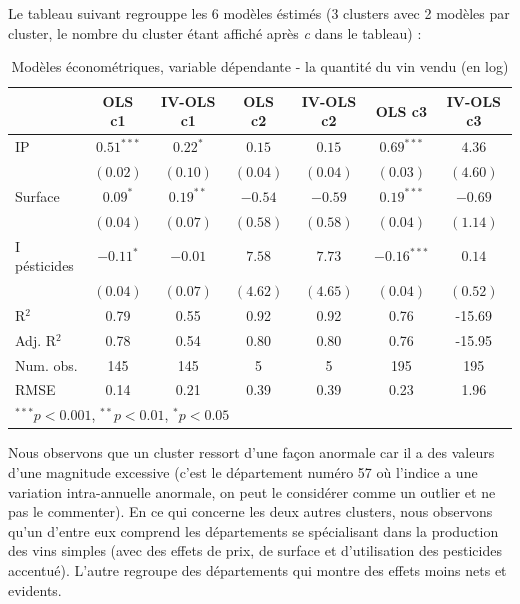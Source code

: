 \documentclass[11pt,]{article}
\begin{document}
Le tableau suivant regrouppe les 6 modèles éstimés (3 clusters avec 2
modèles par cluster, le nombre du cluster étant affiché après \emph{c}
dans le tableau) :

\FloatBarrier

\begin{table}[!htbp]
\begin{center}
\begin{tabular}{l c c c c c c }
\hline
 & OLS c1 & IV-OLS c1 & OLS c2 & IV-OLS c2 & OLS c3 & IV-OLS c3 \\
\hline
IP           & $0.51^{***}$ & $0.22^{*}$  & $0.15$   & $0.15$   & $0.69^{***}$  & $4.36$   \\
             & $(0.02)$     & $(0.10)$    & $(0.04)$ & $(0.04)$ & $(0.03)$      & $(4.60)$ \\
Surface      & $0.09^{*}$   & $0.19^{**}$ & $-0.54$  & $-0.59$  & $0.19^{***}$  & $-0.69$  \\
             & $(0.04)$     & $(0.07)$    & $(0.58)$ & $(0.58)$ & $(0.04)$      & $(1.14)$ \\
I pésticides & $-0.11^{*}$  & $-0.01$     & $7.58$   & $7.73$   & $-0.16^{***}$ & $0.14$   \\
             & $(0.04)$     & $(0.07)$    & $(4.62)$ & $(4.65)$ & $(0.04)$      & $(0.52)$ \\
\hline
R$^2$        & 0.79         & 0.55        & 0.92     & 0.92     & 0.76          & -15.69   \\
Adj. R$^2$   & 0.78         & 0.54        & 0.80     & 0.80     & 0.76          & -15.95   \\
Num. obs.    & 145          & 145         & 5        & 5        & 195           & 195      \\
RMSE         & 0.14         & 0.21        & 0.39     & 0.39     & 0.23          & 1.96     \\
\hline
\multicolumn{7}{l}{\scriptsize{$^{***}p<0.001$, $^{**}p<0.01$, $^*p<0.05$}}
\end{tabular}
\caption{Modèles économétriques, variable dépendante - la quantité du vin vendu (en log)}
\label{table : ols et ivols clusters}
\end{center}
\end{table}

\FloatBarrier

Nous observons que un cluster ressort d'une façon anormale car il a des
valeurs d'une magnitude excessive (c'est le département numéro 57 où
l'indice a une variation intra-annuelle anormale, on peut le considérer
comme un outlier et ne pas le commenter). En ce qui concerne les deux
autres clusters, nous observons qu'un d'entre eux comprend les
départements se spécialisant dans la production des vins simples (avec
des effets de prix, de surface et d'utilisation des pesticides
accentué). L'autre regroupe des départements qui montre des effets moins
nets et evidents.
\end{document}
